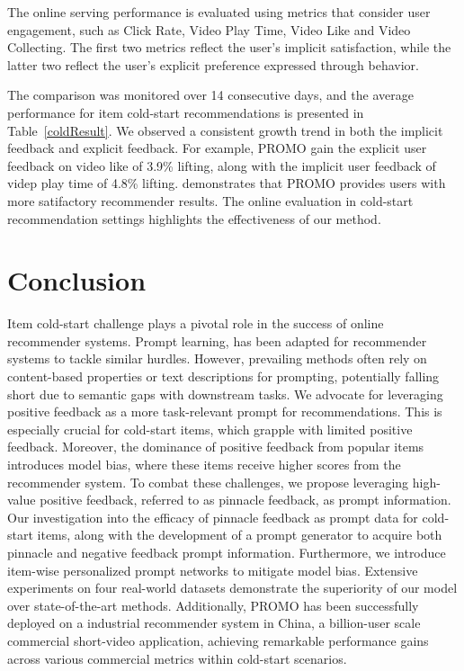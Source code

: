 \documentclass[sigconf]{acmart}
\newcommand{\sys}{\textsc{PROMO}\xspace}
\begin{document}
The online serving performance is evaluated using metrics that consider user engagement, such as Click Rate, Video Play Time, Video Like and Video Collecting.
The first two metrics reflect the user's implicit satisfaction, while the latter two reflect the user's explicit preference expressed through behavior. 

The comparison was monitored over 14 consecutive days, and the average performance for item cold-start recommendations is presented in Table~\ref{coldResult}.
We observed a consistent growth trend in both the implicit feedback and explicit feedback.
For example, \sys gain the explicit user feedback on video like of 3.9\% lifting, along with the implicit user feedback of videp play time of 4.8\% lifting. 
demonstrates that \sys provides users with more satifactory recommender results. 
The online evaluation in cold-start recommendation settings highlights the effectiveness of our method.

\section{Conclusion}
Item cold-start challenge plays a pivotal role in the success of online recommender systems. 
Prompt learning, has been adapted for recommender systems to tackle similar hurdles. 
However, prevailing methods often rely on content-based properties or text descriptions for prompting, potentially falling short due to semantic gaps with downstream tasks. 
We advocate for leveraging positive feedback as a more task-relevant prompt for recommendations.
This is especially crucial for cold-start items, which grapple with limited positive feedback. 
Moreover, the dominance of positive feedback from popular items introduces model bias, where these items receive higher scores from the recommender system.
To combat these challenges, we propose leveraging high-value positive feedback, referred to as pinnacle feedback, as prompt information. 
Our investigation into the efficacy of pinnacle feedback as prompt data for cold-start items, along with the development of a prompt generator to acquire both pinnacle and negative feedback prompt information. 
Furthermore, we introduce item-wise personalized prompt networks to mitigate model bias. 
Extensive experiments on four real-world datasets demonstrate the superiority of our model over state-of-the-art methods. 
Additionally, \sys has been successfully deployed on a industrial recommender system in China, a billion-user scale commercial short-video application, achieving remarkable performance gains across various commercial metrics within cold-start scenarios.
\end{document}

